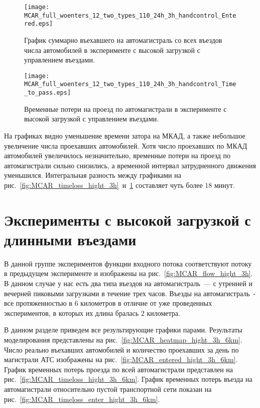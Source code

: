\begin{figure}[ht]
    \begin{minipage}[b][][b]{0.49\textwidth}
        \centering
        \texttt{[image: MCAR\_full\_woenters\_12\_two\_types\_110\_24h\_3h\_handcontrol\_Entered.eps]}
        \caption{График суммарно въехавшего на автомагистраль со всех въездов числа автомобилей в эксперименте с высокой загрузкой с управлением въездами.}
        \label{fig:MCAR_entered_hight_3h_handcontrol}
    \end{minipage}
    \hfill
    \begin{minipage}[b][][b]{0.49\textwidth}
        \centering
        \texttt{[image: MCAR\_full\_woenters\_12\_two\_types\_110\_24h\_3h\_handcontrol\_Time\_to\_pass.eps]}
        \caption{Временные потери на проезд по автомагистрали в эксперименте с высокой загрузкой с управлением въездами.}
        \label{fig:MCAR_timeloss_hight_3h_handcontrol}
    \end{minipage}
\end{figure}

На графиках видно уменьшение времени затора на МКАД, а также небольшое увеличение числа проехавших автомобилей.
Хотя число проехавших по МКАД автомобилей увеличилось незначительно, временные потери на проезд по автомагистрали сильно снизились, а временной интервал затрудненного движения уменьшился.
Интегральная разность между графиками на рис.~\ref{fig:MCAR_timeloss_hight_3h}~и~\ref{fig:MCAR_timeloss_hight_3h_handcontrol} составляет чуть более $18$ минут.

\section{Эксперименты с высокой загрузкой с длинными въездами}
В данной группе экспериментов функции входного потока соответствуют потоку в предыдущем эксперименте и изображены на рис.~\ref{fig:MCAR_flow_hight_3h}.
В данном случае у нас есть два типа въездов на автомагистраль~--- с утренней и вечерней пиковыми загрузками в течение трех часов.
Въезды на автомагистраль~- все протяженностью в $6$ километров в отличие от уже проведенных экспериментов, в которых их длина бралась $2$ километра.

В данном разделе приведем все результирующие графики парами.
Результаты моделирования представлены на рис.~\ref{fig:MCAR_heatmap_hight_3h_6km}.
Число реально въехавших автомобилей и количество проехавших за день по магистрали АТС изображены на рис.~\ref{fig:MCAR_entered_hight_3h_6km}.
График временных потерь проезда по всей автомагистрали представлен на рис.~\ref{fig:MCAR_timeloss_hight_3h_6km}.
График временных потерь въезда на автомагистрали относительно пустой транспортной сети показан на рис.~\ref{fig:MCAR_timeloss_enter_hight_3h_6km}.

